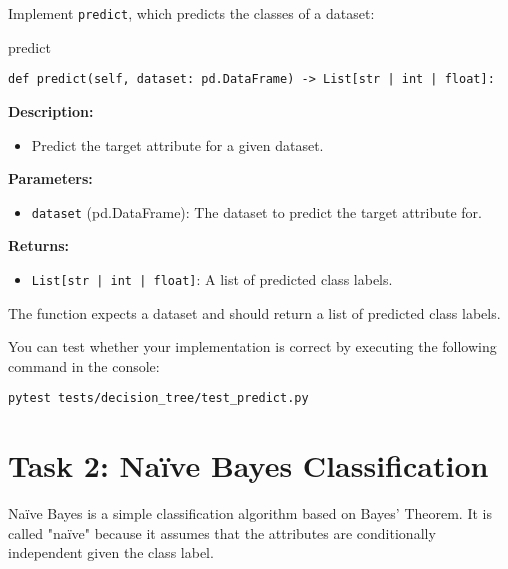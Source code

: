 \documentclass[
english,
smallborders
]{i6prcsht}
\begin{document}
Implement \texttt{predict}, which predicts the classes of a dataset:

\vspace*{0.3cm}

\begin{functionbox}{predict}
	\begin{lstlisting}[numbers=none]
def predict(self, dataset: pd.DataFrame) -> List[str | int | float]:
\end{lstlisting}
	
	\textbf{Description:}
	\begin{itemize}[leftmargin=*,topsep=0pt]
		\item Predict the target attribute for a given dataset.
	\end{itemize}
	
	\textbf{Parameters:}
	\begin{itemize}[leftmargin=*,topsep=0pt]
		\item \texttt{dataset} (pd.DataFrame): The dataset to predict the target attribute for.
	\end{itemize}
	
	\textbf{Returns:}
	\begin{itemize}[leftmargin=*,topsep=0pt]
		\item \texttt{List[str | int | float]}: A list of predicted class labels.
	\end{itemize}
\end{functionbox}

\vspace*{0.5cm}

The function expects a dataset and should return a list of predicted class labels.

You can test whether your implementation is correct by executing the following command in the console:

\vspace*{0.3cm}

\begin{lstlisting}
pytest tests/decision_tree/test_predict.py
\end{lstlisting}

\newpage

\section*{Task 2: Naïve Bayes Classification}
\label{sec:task-two}

Naïve Bayes is a simple classification algorithm based on Bayes' Theorem. It is called "naïve" because it assumes that the attributes are conditionally independent given the class label.
\end{document}
